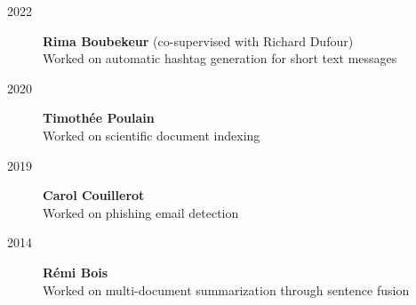 \begin{description}

    \item[2022] \textbf{Rima Boubekeur}
                (co-supervised with Richard Dufour) \\
                Worked on automatic hashtag generation for short text messages

    \item[2020] \textbf{Timothée Poulain} \\
                Worked on scientific document indexing

    \item[2019] \textbf{Carol Couillerot} \\
                Worked on phishing email detection

    \item[2014] \textbf{Rémi Bois} \\
                Worked on multi-document summarization through sentence fusion

\end{description}